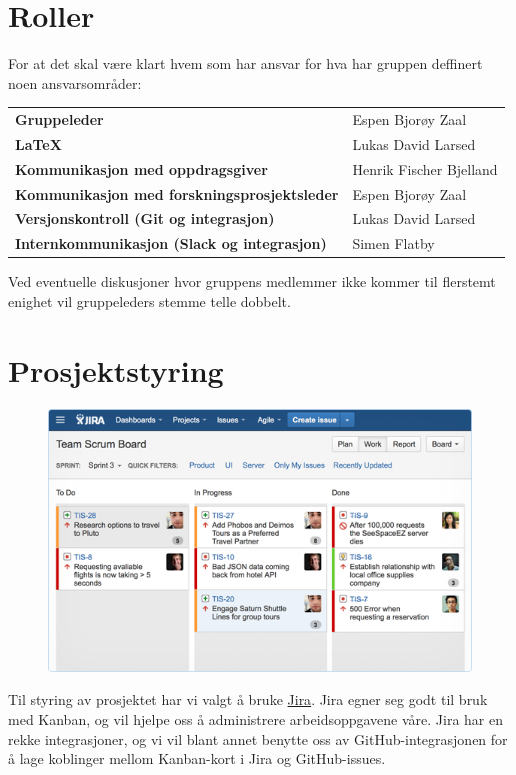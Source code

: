 \section{Roller}
For at det skal være klart hvem som har ansvar for hva har gruppen deffinert noen ansvarsområder:
\begin{flushleft}
\renewcommand{\arraystretch}{1.5}
\begin{tabular}[ht]{@{}ll@{}}
\textbf{Gruppeleder} & Espen Bjorøy Zaal \\
\textbf{\LaTeX} & Lukas David Larsed \\
\textbf{Kommunikasjon med oppdragsgiver} & Henrik Fischer Bjelland \\
\textbf{Kommunikasjon med forskningsprosjektsleder} & Espen Bjorøy Zaal \\
\textbf{Versjonskontroll (Git og integrasjon)} & Lukas David Larsed \\
\textbf{Internkommunikasjon (Slack og integrasjon)} & Simen Flatby \\
\end{tabular} 
\end{flushleft}
Ved eventuelle diskusjoner hvor gruppens medlemmer ikke kommer til flerstemt enighet vil gruppeleders stemme telle dobbelt.

\section{Prosjektstyring}
\begin{figure}
\vspace{-0.5cm}
\includegraphics[scale=0.5, keepaspectratio]{./img/arbeidsmetodikk/jira_kanban.png}
\end{figure}
Til styring av prosjektet har vi valgt å bruke \href{https://www.atlassian.com/software/jira}{Jira}. Jira egner seg godt til bruk med Kanban, og vil hjelpe oss å administrere arbeidsoppgavene våre. Jira har en rekke integrasjoner, og vi vil blant annet benytte oss av GitHub-integrasjonen for å lage koblinger mellom Kanban-kort i Jira og GitHub-issues.

